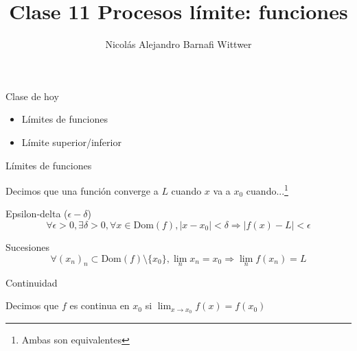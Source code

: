 \documentclass[14pt,aspectratio=169,xcolor=dvipsnames]{beamer}
\title[short title]{Clase 11 Procesos límite: funciones}
\subtitle{}
\author[NA Barnafi] {Nicolás Alejandro Barnafi Wittwer}
\institute[UC|CMM] 
{
    Pontificia Universidad Católica de Chile \\
    Centro de Modelamiento Matemático
}
\date{}
\begin{document}
\begin{frame}
    \maketitle
\end{frame}
\begin{frame}{Clase de hoy}
    \begin{itemize}
        \item Límites de funciones
        \item Límite superior/inferior
    \end{itemize}

    \vspace{1cm}
\end{frame}
\begin{frame}{Límites de funciones}
    \begin{small}
        Decimos que una función converge a $L$ cuando $x$ va a $x_0$ cuando...\footnote{Ambas son equivalentes}
        \begin{block}{Epsilon-delta ($\epsilon-\delta$)}
            $$\forall \epsilon>0, \exists \delta >0, \forall x\in \text{Dom}(f), |x-x_0|<\delta \Rightarrow |f(x) - L| < \epsilon $$
        \end{block}

        \begin{block}{Sucesiones}
            $$\forall (x_n)_n \subset \text{Dom}(f)\setminus \{x_0\}, \lim_n x_n = x_0 \Rightarrow \lim_n f(x_n) = L $$
        \end{block}
    \end{small}
\end{frame}
\begin{frame}{Continuidad}
    \begin{block}{}
        Decimos que $f$ es continua en $x_0$ si $\lim_{x\to x_0}f(x) = f(x_0)$
    \end{block}
\end{frame}
\end{document}
